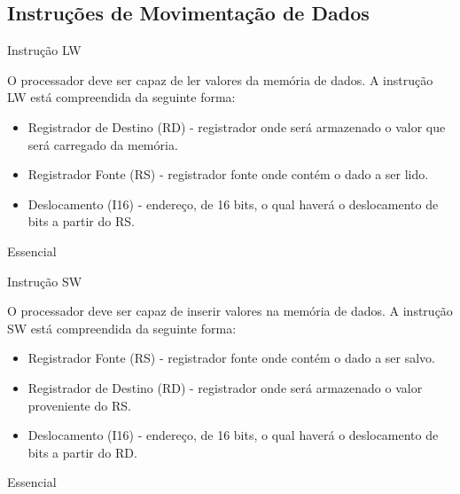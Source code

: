 \documentclass{article}
\begin{document}
  \subsection{Instruções de Movimentação de Dados}
    \begin{functional}
     \requirement
      {Instrução LW}
      {O processador deve ser capaz de ler valores da memória de dados.
       A instrução LW está compreendida da seguinte forma:\\
       \begin{itemize}
        \item Registrador de Destino (RD) - registrador onde será armazenado o valor que será carregado da memória.
        \item Registrador Fonte (RS) - registrador fonte onde contém o dado a ser lido.
        \item Deslocamento (I16) - endereço, de 16 bits, o qual haverá o deslocamento de bits a partir do RS.
       \end{itemize}
       }
      {Essencial}

     \requirement
      {Instrução SW}
      {O processador deve ser capaz de inserir valores na memória de dados.
      A instrução SW está compreendida da seguinte forma:\\
       \begin{itemize}
        \item Registrador Fonte (RS) - registrador fonte onde contém o dado a ser salvo.
        \item Registrador de Destino (RD) - registrador onde será armazenado o valor proveniente do RS.
        \item Deslocamento (I16) - endereço, de 16 bits, o qual haverá o deslocamento de bits a partir do RD.
       \end{itemize}
       }
      {Essencial}
    \end{functional}
\end{document}

